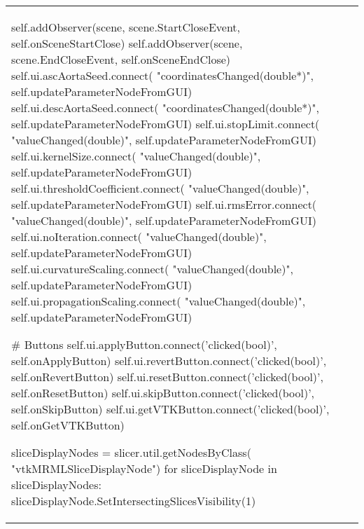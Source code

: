 \documentclass[12pt, titlepage]{article}
\begin{document}
\begin{longtable}[H]{p{} p{} p{}}
\begin{python}
        self.addObserver(scene, scene.StartCloseEvent, self.onSceneStartClose)
        self.addObserver(scene, scene.EndCloseEvent, self.onSceneEndClose)
        self.ui.ascAortaSeed.connect(
            "coordinatesChanged(double*)", self.updateParameterNodeFromGUI)
        self.ui.descAortaSeed.connect(
            "coordinatesChanged(double*)", self.updateParameterNodeFromGUI)
        self.ui.stopLimit.connect(
            "valueChanged(double)", self.updateParameterNodeFromGUI)
        self.ui.kernelSize.connect(
            "valueChanged(double)", self.updateParameterNodeFromGUI)
        self.ui.thresholdCoefficient.connect(
            "valueChanged(double)", self.updateParameterNodeFromGUI)
        self.ui.rmsError.connect(
            "valueChanged(double)", self.updateParameterNodeFromGUI)
        self.ui.noIteration.connect(
            "valueChanged(double)", self.updateParameterNodeFromGUI)
        self.ui.curvatureScaling.connect(
            "valueChanged(double)", self.updateParameterNodeFromGUI)
        self.ui.propagationScaling.connect(
            "valueChanged(double)", self.updateParameterNodeFromGUI)

        # Buttons
        self.ui.applyButton.connect('clicked(bool)', self.onApplyButton)
        self.ui.revertButton.connect('clicked(bool)', self.onRevertButton)
        self.ui.resetButton.connect('clicked(bool)', self.onResetButton)
        self.ui.skipButton.connect('clicked(bool)', self.onSkipButton)
        self.ui.getVTKButton.connect('clicked(bool)', self.onGetVTKButton)

        sliceDisplayNodes = slicer.util.getNodesByClass(
            "vtkMRMLSliceDisplayNode")
        for sliceDisplayNode in sliceDisplayNodes:
            sliceDisplayNode.SetIntersectingSlicesVisibility(1)


\end{python}
\end{longtable}
\end{document}
